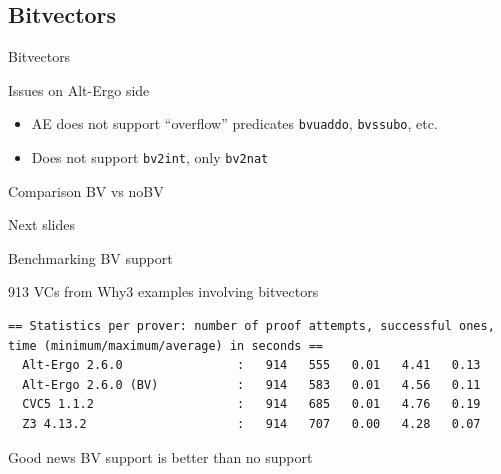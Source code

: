 \documentclass[aspectratio=169]{beamer}
\begin{document}
\subsection{Bitvectors}

\begin{frame}{Bitvectors}

  \begin{block}{Issues on Alt-Ergo side}
  \begin{itemize}
  \item AE does not support ``overflow'' predicates \texttt{bvuaddo}, \texttt{bvssubo}, etc.

  \item Does not support \texttt{bv2int}, only \texttt{bv2nat}

  \end{itemize}

\end{block}

\vfill

  \begin{block}{Comparison BV vs noBV}

    Next slides

  \end{block}
\end{frame}

\begin{frame}[fragile]{Benchmarking BV support}

  913 VCs from Why3 examples involving bitvectors

\begin{verbatim}
== Statistics per prover: number of proof attempts, successful ones, time (minimum/maximum/average) in seconds ==
  Alt-Ergo 2.6.0                :   914   555   0.01   4.41   0.13
  Alt-Ergo 2.6.0 (BV)           :   914   583   0.01   4.56   0.11
  CVC5 1.1.2                    :   914   685   0.01   4.76   0.19
  Z3 4.13.2                     :   914   707   0.00   4.28   0.07
\end{verbatim}

  \begin{block}{Good news}
    BV support is better than no support
  \end{block}

\end{frame}
\end{document}

